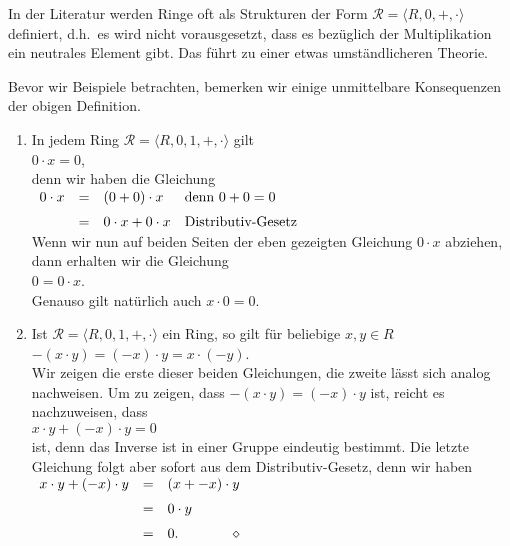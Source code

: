 \remark
In der Literatur werden Ringe oft als Strukturen der Form $\mathcal{R} = \langle R, 0, +, \cdot \rangle$ 
definiert, d.h.~es wird nicht vorausgesetzt, dass es bez\"uglich der Multiplikation ein neutrales
Element gibt.  Das f\"uhrt zu einer etwas umst\"andlicheren Theorie.  \eoxs

\remark
Bevor wir Beispiele betrachten, bemerken wir einige unmittelbare Konsequenzen der obigen Definition.
\begin{enumerate}
\item In jedem Ring $\mathcal{R} = \langle R, 0, 1, +, \cdot \rangle$ gilt
      \\[0.2cm]
      \hspace*{1.3cm}
      $0 \cdot x = 0$,
      \\[0.2cm]
      denn wir haben die Gleichung
      \\[0.2cm]
      \hspace*{1.3cm}
      $
      \begin{array}[t]{lcll}
        0 \cdot x & = & (0 + 0) \cdot x 
                      & \mbox{denn $0 + 0 = 0$} \\[0.2cm]
                  & = & 0 \cdot x + 0 \cdot x
                      & \mbox{Distributiv-Gesetz}
      \end{array}
      $
      \\[0.2cm]
      Wenn wir nun auf beiden Seiten der eben gezeigten Gleichung 
      $0 \cdot x$ abziehen, dann erhalten wir die Gleichung
      \\[0.2cm]
      \hspace*{1.3cm}
      $0 = 0 \cdot x$.
      \\[0.2cm]
      Genauso gilt nat\"{u}rlich auch $x \cdot 0 = 0$. 
\item Ist $\mathcal{R} = \langle R, 0, 1, +, \cdot \rangle$ ein Ring, so gilt f\"ur beliebige $x,y \in R$
      \\[0.2cm]
      \hspace*{1.3cm}
      $-(x \cdot y) = (-x) \cdot y = x \cdot (-y)$.
      \\[0.2cm]
      Wir zeigen die erste dieser beiden Gleichungen, die zweite l\"{a}sst sich analog nachweisen.
      Um zu zeigen, dass $-(x \cdot y) = (-x) \cdot y$ ist, reicht es nachzuweisen, dass
      \\[0.2cm]
      \hspace*{1.3cm}
      $x \cdot y + (-x) \cdot y = 0$
      \\[0.2cm]
      ist, denn das Inverse ist in einer Gruppe eindeutig bestimmt.  Die letzte Gleichung folgt aber sofort
      aus dem Distributiv-Gesetz, denn wir haben
      \\[0.2cm]
      \hspace*{1.3cm}
      $
      \begin{array}[t]{lcl}
      x \cdot y + (-x) \cdot y & = & (x + - x) \cdot y \\[0.2cm]
                               & = & 0 \cdot y \\[0.2cm]
                               & = & 0. \hspace*{\fill} \diamond
      \end{array}
      $
\end{enumerate}


